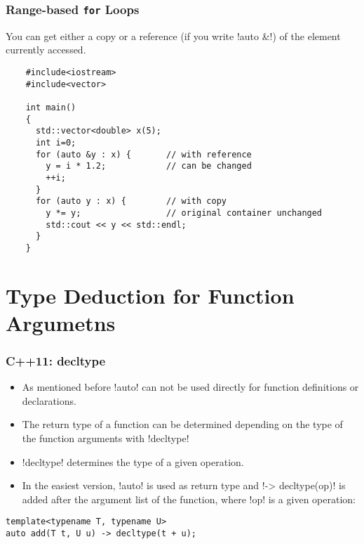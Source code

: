 \begin{frame}[fragile]
  \frametitle<presentation>{Range-based \texttt{for} Loops}

  You can get either a copy or a reference (if you write \inline!auto &!) of the element currently accessed.

  \begin{lstlisting}
    #include<iostream>
    #include<vector>

    int main()
    {
      std::vector<double> x(5);
      int i=0;
      for (auto &y : x) {       // with reference
        y = i * 1.2;            // can be changed
        ++i;
      }
      for (auto y : x) {        // with copy
        y *= y;                 // original container unchanged
        std::cout << y << std::endl;
      }
    }
  \end{lstlisting}

\end{frame}

\section{Type Deduction for Function Argumetns}
\begin{frame}[fragile]
\frametitle{C++11: decltype}
\begin{itemize}
\item As mentioned before \inline!auto! can not be used directly for function definitions or declarations. 
\item The return type of a function can be determined depending on the type of the function arguments with \inline!decltype!
\item \inline!decltype! determines the type of a given operation.
\item In the easiest version, \inline!auto! is used as return type and \inline!-> decltype(op)! is added after the argument list of the function, where \inline!op! is a given operation:
\end{itemize}
\begin{lstlisting}
template<typename T, typename U>
auto add(T t, U u) -> decltype(t + u);
\end{lstlisting}

\end{frame}


